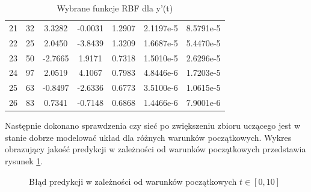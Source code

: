 \begin{table}[ht!]
\begin{tabular}{ |c| c| c| c| c| c| c| }
   21 &  32 &   3.3282  & -0.0031  &  1.2907  &  2.1197e-5 & 8.5791e-5   \\
   22 &  25 &   2.0450  & -3.8439  &  1.3209  &  1.6687e-5 & 5.4470e-5   \\
   23 &  50 &  -2.7665  &  1.9171  &  0.7318  &  1.5010e-5 & 2.6296e-5   \\
   24 &  97 &   2.0519  &  4.1067  &  0.7983  &  4.8446e-6 & 1.7203e-5   \\
   25 &  63 &  -0.8497  & -2.6336  &  0.6773  &  3.5100e-6 & 1.0615e-5   \\
   26 &  83 &   0.7341  & -0.7148  &  0.6868  &  1.4466e-6 & 7.9001e-6   \\
   \hline
\end{tabular}

\caption{Wybrane funkcje RBF dla y'(t)}
\label{tab:rbf_tabela2_x2}
\end{table}

\clearpage
 Następnie dokonano sprawdzenia czy sieć po zwiększeniu zbioru uczącego jest w stanie dobrze modelować układ dla różnych warunków początkowych. Wykres obrazujący jakość predykcji w zależności od warunków początkowych przedstawia rysunek \ref{img:err_initial2}.


\begin{figure}[ht!]
	\centering

	

	\caption{Błąd predykcji w zależności od warunków początkowych $t \in [0,10]$}
	\label{img:err_initial2}
\end{figure}

